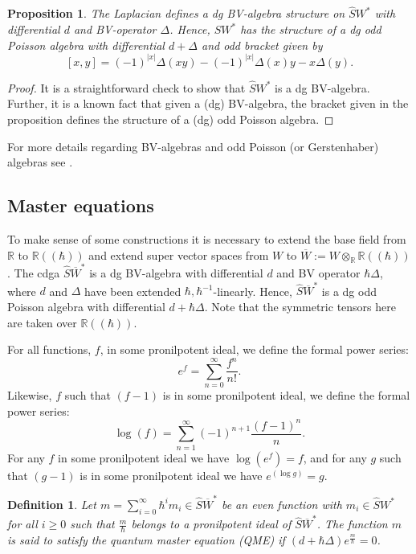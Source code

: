 \documentclass[]{amsart}
\newtheorem{proposition}[theorem]{Proposition}
\newtheorem{definition}[theorem]{Definition}
\theoremstyle{definition}
\begin{document}
\begin{proposition}\label{prop_BV_alg}
The Laplacian defines a dg BV-algebra structure on $\hat{S} W^*$ with differential $d$ and BV-operator $\Delta$. Hence, $\hat{S} W^*$  has the structure of a dg odd Poisson algebra with differential $d+\Delta$ and odd bracket given by
\[
[x,y]=(-1)^{|x|}\Delta (xy)-(-1)^{|x|}\Delta (x)y - x\Delta(y).
\]
\end{proposition}
\begin{proof}
It is a straightforward check to show that $\hat{S} W^*$ is a dg BV-algebra. Further, it is a known fact that given a (dg) BV-algebra, the bracket given in the proposition defines the structure of a (dg) odd Poisson algebra.
\end{proof}

For more details regarding BV-algebras and odd Poisson (or Gerstenhaber) algebras see \cite{roger_gerstenhaber}.

\subsection{Master equations}\label{sec_master_equations}
To make sense of some constructions it is necessary to extend the base field from $\mathbb{R}$ to $\mathbb{R}((\hbar))$ and extend super vector spaces from $W$ to $\overline{W}:=W\otimes_{\mathbb{R}} \mathbb{R}((\hbar ))$. The cdga $\hat{S} \overline{W}^*$ is a dg BV-algebra with differential $d$ and BV operator $\hbar\Delta$, where $d$ and $\Delta$ have been extended $\hbar,\hbar^{-1}$-linearly. Hence, $\hat{S} \overline{W}^*$ is a dg odd Poisson algebra with differential $d+\hbar\Delta$. Note that the symmetric tensors here are taken over $\mathbb{R}((\hbar ))$.

For all functions, $f$, in some pronilpotent ideal, we define the formal power series:
\[
e^f=\sum_{n=0}^\infty \frac{f^n}{n!}.
\]
Likewise, $f$ such that $(f-1)$ is in some pronilpotent ideal, we define the formal power series:
\[
\log (f) = \sum_{n=1}^\infty (-1)^{n+1}\frac{(f-1)^n}{n}.
\]
For any $f$ in some pronilpotent ideal we have $\log (e^f)=f$, and for any $g$ such that $(g-1)$ is in some pronilpotent ideal we have $e^{(\log g)}=g$.

\begin{definition}
Let $m= \sum _{i=0}^\infty \hbar^i m_i \in \hat{S} \overline{W}^*$ be an even function with $m_i\in\hat{S} W^*$ for all $i\geq 0$ such that $\frac{m}{\hbar}$ belongs to a pronilpotent ideal of $\hat{S} \overline{W}^*$. The function $m$ is said to satisfy the quantum master equation (QME) if $(d+\hbar\Delta) e^\frac{m}{\hbar}=0$.
\end{definition}
\end{document}
